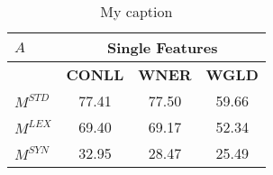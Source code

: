 \begin{table}[h]
\centering
\begin{tabular}{@{}lccc@{}}
\toprule
$A$                           & \multicolumn{3}{c}{\textbf{Single Features}} \\ \midrule
                & \textbf{CONLL}    & \textbf{WNER}     & \textbf{WGLD}    \\ \cmidrule{2-4}
$M^{STD}$                        & 77.41    & 77.50    & 59.66   \\
$M^{LEX}$                       & 69.40    & 69.17    & 52.34   \\
$M^{SYN}$                        & 32.95    & 28.47    & 25.49   \\ \bottomrule
\end{tabular}
\caption{My caption}
\label{my-label}
\end{table}

